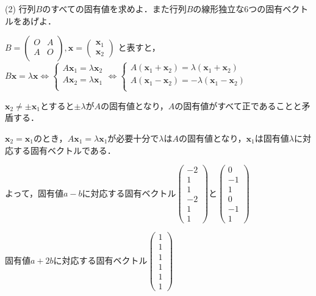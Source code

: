 \documentclass[a4j]{jarticle}
\let \ds \displaystyle
\begin{document}
\begin{screen}
 (2) 行列$B$のすべての固有値を求めよ．また行列$B$の線形独立な6つの固有ベクトルをあげよ．
\end{screen}

$\ds B =
\left(
\begin{array}{c|c}
 O&A \\
 \hline
 A&O \\
\end{array}
\right),
\bm{x} =
\left(
\begin{array}{c}
 \bm{x}_1\\ \hline 
 \bm{x}_2
\end{array}
\right)$ と表すと，$B\bm{x}=\lambda \bm{x} \Leftrightarrow
\begin{cases}
 A \bm{x}_1 = \lambda \bm{x}_2 \\
 A \bm{x}_2 = \lambda \bm{x}_1 \\
\end{cases}
\Leftrightarrow
\begin{cases}
 A (\bm{x}_1+\bm{x}_2) = \lambda(\bm{x}_1+\bm{x}_2) \\
 A (\bm{x}_1-\bm{x}_2) = -\lambda(\bm{x}_1-\bm{x}_2) \\
\end{cases}
$ 

$\bm{x}_2 \neq \pm \bm{x}_1 $とすると$\pm \lambda$が$A$の固有値となり，$A$の固有値がすべて正であることと矛盾する．

$\bm{x}_2 = \bm{x}_1$のとき，$A \bm{x}_1 = \lambda \bm{x}_1$が必要十分で$\lambda$は$A$の固有値となり，$\bm{x}_1$は固有値$\lambda$に対応する固有ベクトルである．

よって，固有値$a-b$に対応する固有ベクトル$\left(\begin{array}{c}-2\\1\\1\\-2\\1\\1\end{array}\right)$と$\left(\begin{array}{c}0\\-1\\1\\0\\-1\\1\end{array}\right)$

固有値$a+2b$に対応する固有ベクトル$\left(\begin{array}{c}1\\1\\1\\1\\1\\1\end{array}\right)$
\end{document}
